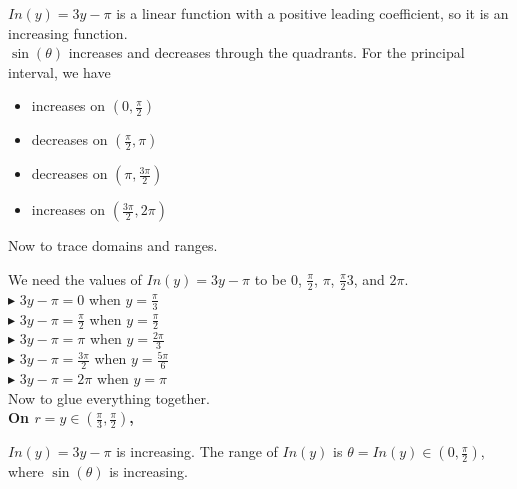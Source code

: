 \documentclass{ximera}
\begin{document}
$In(y) = 3y - \pi$ is a linear function with a positive leading coefficient, so it is an increasing function.\\


$\sin(\theta)$ increases and decreases through the quadrants. For the principal interval, we have


\begin{itemize}
  \item increases on $\left( 0, \frac{\pi}{2} \right)$
  \item decreases on $\left( \frac{\pi}{2}, \pi \right)$
  \item decreases on $\left( \pi, \frac{3\pi}{2} \right)$
  \item increases on $\left( \frac{3\pi}{2}, 2\pi \right)$
\end{itemize}


Now to trace domains and ranges.


We need the values of $In(y) = 3y - \pi$ to be $0$, $\frac{\pi}{2}$, $\pi$, $\frac{\pi}{2}3$, and $2\pi$. \\



$\blacktriangleright$ $3y - \pi = 0$ when $y = \frac{\pi}{3}$ \\

$\blacktriangleright$ $3y - \pi = \frac{\pi}{2}$ when $y = \frac{\pi}{2}$ \\

$\blacktriangleright$ $3y - \pi = \pi$ when $y = \frac{2\pi}{3}$ \\

$\blacktriangleright$ $3y - \pi = \frac{3\pi}{2}$ when $y = \frac{5\pi}{6}$ \\

$\blacktriangleright$ $3y - \pi = 2\pi$ when $y = \pi$ \\





Now to glue everything together. \\



\textbf{\textcolor{purple!80!black}{On $r = y \in \left( \frac{\pi}{3}, \frac{\pi}{2} \right)$, }}



$In(y) = 3y - \pi$ is increasing.  The range of $In(y)$ is $\theta = In(y) \in \left(0, \frac{\pi}{2} \right)$, where $\sin(\theta)$ is increasing. \\
\end{document}
